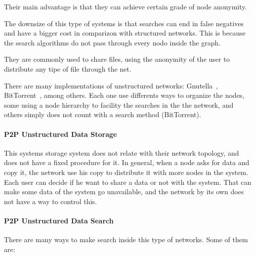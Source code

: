 Their main advantage is that they can achieve certain grade of node anonymity.

The downsize of this type of systems is that searches can end in false
negatives and have a bigger cost in comparizon with structured networks. This
is because the search algorithms do not pass through every nodo inside the
graph.

They are commonly used to share files, using the anonymity of the user to
distribute any tipe of file through the net.

There are many implementations of unstructured networks:
Gnutella~\cite{oai:CiteSeerXPSU:10.1.1.61.7302}, 
BitTorrent~\cite{bittorrent}, 
among others. Each one use differents ways to organize the nodes, some using a
node hierarchy to facility the searches in the the network, and others simply
does not count with a search method (BitTorrent).

\paragraph{P2P Unstructured Data Storage}
\label{sec:p2p_unstructured_storage}

This systems storage system does not relate with their network topology, and
does not have a fixed procedure for it. In general, when a node asks for data
and copy it, the network use his copy to distribute it with more nodes in the
system. Each user can decide if he want to share a data or not with the system.
That can make some data of the system go unavailable, and the network by its
own does not have a way to control this.


\paragraph{P2P Unstructured Data Search}
\label{sec:p2p_unstructured_search}

There are many ways to make search inside this type of networks. Some of them
are:

